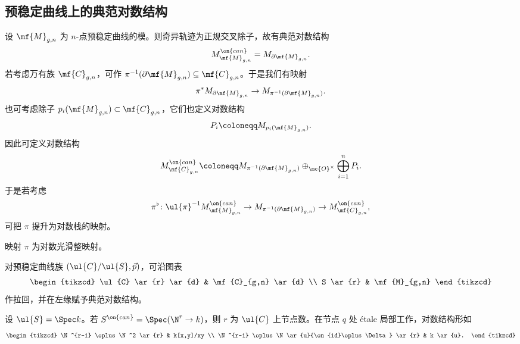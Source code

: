 \subsection{预稳定曲线上的典范对数结构}%
\label{sub:Canonical log structures on prestable curves}

设 \(\mf{M}_{g,n}\) 为 \(n\)-点预稳定曲线的模。则奇异轨迹为正规交叉除子，故有典范对数结构
\[ M_{\mf{M}_{g,n}}^{\on{can}} = M_{\partial \mf{M}_{g,n}}. \]
若考虑万有族 \(\mf{C}_{g,n}\)，可作 \(\pi^{-1}(\partial \mf{M}_{g,n}) \subseteq \mf{C}_{g,n}\)。于是我们有映射
\[ \pi^* M_{\partial \mf{M}_{g,n}} \to M_{\pi^{-1}(\partial \mf{M}_{g,n})}. \]
也可考虑除子 \(p_i(\mf{M}_{g,n}) \subset \mf{C}_{g,n}\)，它们也定义对数结构
\[ P_i \coloneqq M_{p_i(\mf{M}_{g,n})}. \]
因此可定义对数结构
\[ M_{\mf{C}_{g,n}}^{\on{can}} \coloneqq M_{\pi^{-1}(\partial\mf{M}_{g,n})} \oplus_{\mc{O}^{\times}} \bigoplus_{i=1}^n P_i. \]
于是若考虑
\[ \pi^{\flat} \colon \ul{\pi}^{-1} M_{\mf{M}_{g,n}}^{\on{can}} \to M_{\pi^{-1}(\partial \mf{M}_{g,n})} \to M_{\mf{C}_{g,n}}^{\on{can}}, \]
可把 \(\pi\) 提升为对数栈的映射。

\begin{thm}
    映射 \(\pi\) 为对数光滑整映射。
\end{thm}

\begin{defn}
    对预稳定曲线族 \((\ul{C}/\ul{S}, \vec{p})\)，可沿图表
    \begin{equation*}
    \begin{tikzcd}
        \ul{C} \ar{r} \ar{d} & \mf{C}_{g,n} \ar{d} \\
        S \ar{r} & \mf{M}_{g,n}
    \end{tikzcd}
    \end{equation*}
    作拉回，并在左缘赋予典范对数结构。
\end{defn}

\begin{rmk}
    设 \(\ul{S} = \Spec k\)。若 \(S^{\on{can}} = \Spec (\N^r \to k)\)，则 \(r\) 为 \(\ul{C}\) 上节点数。在节点 \(q\) 处 \'etale 局部工作，对数结构形如
    \begin{equation*}
    \begin{tikzcd}
        \N^{r-1} \oplus \N^2 \ar{r} & k[x,y]/xy \\
        \N^{r-1} \oplus \N \ar{u}{\on{id}\oplus\Delta} \ar{r} & k \ar{u}.
    \end{tikzcd}
    \end{equation*}
\end{rmk}

